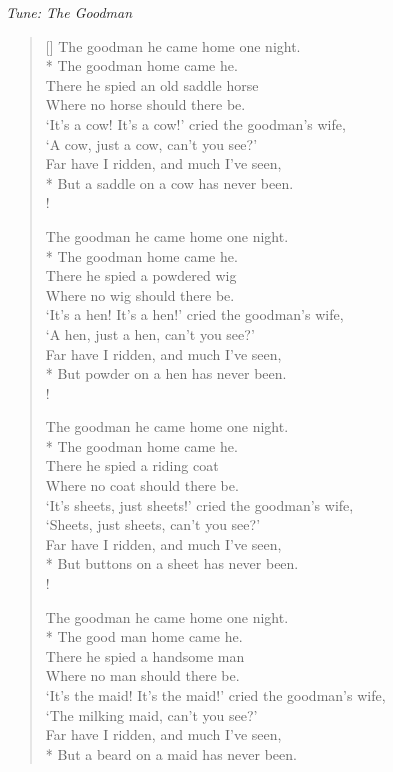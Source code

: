 \documentclass[MAIN]{subfiles}
\begin{document}
\begin{center}
\emph{Tune: The Goodman}
\end{center}

\bigskip

\settowidth{\versewidth}{`It's a cow! It's a cow!' cried the goodman's wife,}
\begin{verse}[\versewidth]
The goodman he came home one night.\\*
The goodman home came he.\\
There he spied an old saddle horse\\
Where no horse should there be.\\
`It's a cow! It's a cow!' cried the goodman's wife,\\
`A cow, just a cow, can't you see?'\\
Far have I ridden, and much I've seen,\\*
But a saddle on a cow has never been.\\!

The goodman he came home one night.\\*
The goodman home came he.\\
There he spied a powdered wig\\
Where no wig should there be.\\
`It's a hen! It's a hen!' cried the goodman's wife,\\
`A hen, just a hen, can't you see?'\\
Far have I ridden, and much I've seen,\\*
But powder on a hen has never been.\\!

The goodman he came home one night.\\*
The goodman home came he.\\
There he spied a riding coat\\
Where no coat should there be.\\
`It's sheets, just sheets!' cried the goodman's wife,\\
`Sheets, just sheets, can't you see?'\\
Far have I ridden, and much I've seen,\\*
But buttons on a sheet has never been.\\!

The goodman he came home one night.\\*
The good man home came he.\\
There he spied a handsome man\\
Where no man should there be.\\
`It's the maid! It's the maid!' cried the goodman's wife,\\
`The milking maid, can't you see?'\\
Far have I ridden, and much I've seen,\\*
But a beard on a maid has never been.
\end{verse}
\end{document}
